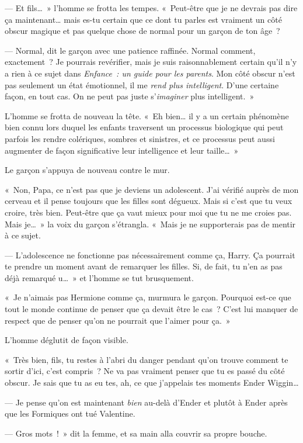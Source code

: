 --- Et fils…~»
l'homme se frotta les tempes.
«~Peut-être que je ne devrais pas dire ça maintenant… mais es-tu certain que ce dont tu parles est vraiment un côté obscur magique et pas quelque chose de normal pour un garçon de ton âge~?

--- Normal, dit le garçon avec une patience raffinée.
Normal comment, exactement~?
Je pourrais revérifier, mais je suis raisonnablement certain qu'il n'y a rien à ce sujet dans \emph{Enfance~: un guide pour les parents}.
Mon côté obscur n'est pas seulement un état émotionnel, il me \emph{rend plus intelligent}.
D'une certaine façon, en tout cas.
On ne peut pas juste s'\emph{imaginer} plus intelligent.~»

L'homme se frotta de nouveau la tête.
«~Eh bien… il y a un certain phénomène bien connu lors duquel les enfants traversent un processus biologique qui peut parfois les rendre colériques, sombres et sinistres, et ce processus peut aussi augmenter de façon significative leur intelligence et leur taille…~»

Le garçon s'appuya de nouveau contre le mur.

«~Non, Papa, ce n'est pas que je deviens un adolescent.
J'ai vérifié auprès de mon cerveau et il pense toujours que les filles sont dégueux.
Mais si c'est que tu veux croire, très bien.
Peut-être que ça vaut mieux pour moi que tu ne me croies pas.
Mais je…~»
la voix du garçon s'étrangla.
«~Mais je ne supporterais pas de mentir à ce sujet.

--- L'adolescence ne fonctionne pas nécessairement comme ça, Harry.
Ça pourrait te prendre un moment avant de remarquer les filles.
Si, de fait, tu n'en as pas déjà remarqué u…~»
et l'homme se tut brusquement.

«~Je n'aimais pas Hermione comme ça, murmura le garçon.
Pourquoi est-ce que tout le monde continue de penser que ça devait être le cas~?
C'est lui manquer de respect que de penser qu'on ne pourrait que l'aimer pour ça.~»

L'homme déglutit de façon visible.

«~Très bien, fils, tu restes à l'abri du danger pendant qu'on trouve comment te sortir d'ici, c'est compris~?
Ne va pas vraiment penser que tu es passé du côté obscur.
Je sais que tu as eu tes, ah, ce que j'appelais tes moments Ender Wiggin…

--- Je pense qu'on est maintenant \emph{bien} au-delà d'Ender et plutôt à Ender après que les Formiques ont tué Valentine.

--- Gros mots~!~»
dit la femme, et sa main alla couvrir sa propre bouche.

